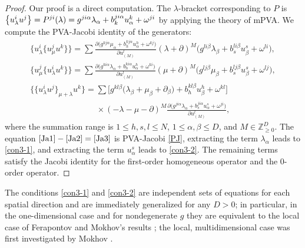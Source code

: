 \documentclass[pdftex]{sigma}
\numberwithin{equation}{section}
\begin{document}
\begin{proof}
Our proof is a direct computation. The $\lambda$-bracket corresponding to $P$ is $\big\lbrace u^i_{\lambda}u^j\big\rbrace=\smash{P^{ji}(\lambda)=g^{ji\alpha}\lambda_\alpha+b^{ji\alpha}_ku^k_\alpha+\omega^{ji}}$ by applying the theory of mPVA. We compute the PVA-Jacobi identity of the generators:
\begin{subequations}
\begin{gather}
\big\lbrace u^i_{\lambda}\big\lbrace u^j_{\mu} u^k\big\rbrace\big\rbrace=\sum\frac{\partial\big(g^{kj\alpha}\mu_\alpha+b^{kj\alpha}_hu^h_\alpha+\omega^{kj}\big)}{\partial u^l_{(M)}}(\lambda+\partial)^M\big(g^{li\beta}\lambda_\beta+b^{li\beta}_su^s_\beta+\omega^{li}\big),\label{Ja1}\\
\big\lbrace u^j_{\mu}\big\lbrace u^i_{\lambda} u^k\big\rbrace\big\rbrace=\sum\frac{\partial\big(g^{ki\alpha}\lambda_\alpha+b^{ki\alpha}_hu^h_\alpha+\omega^{ki}\big)}{\partial u^l_{(M)}}(\mu+\partial)^M\big(g^{lj\beta}\mu_\beta+b^{lj\beta}_su^s_\beta+\omega^{lj}\big),\label{Ja2}\\
\big\lbrace\big\lbrace u^i_{\lambda} u^j\big\rbrace_{\mu+\lambda}u^k\big\rbrace=\sum\big[g^{kl\beta} \big(\lambda_\beta+\mu_\beta+\partial_\beta\big)+b^{kl\beta}_hu^h_\beta+\omega^{kl}\big]\nonumber\\
\phantom{\big\lbrace\big\lbrace u^i_{\lambda} u^j\big\rbrace_{\mu+\lambda}u^k\big\rbrace=}{}\times(-\lambda-\mu-\partial)^M\frac{\partial\big(g^{ji\alpha} \lambda_\alpha+b^{ji\alpha}_su^s_\alpha+\omega^{ji}\big)}{\partial u^l_{(M)}},\label{Ja3}
\end{gather}
\end{subequations}
where the summation range is $1\leq h,s,l\leq N$, $1\leq\alpha,\beta\leq D$, and $M\in\mathbb{Z}^D_{\geq0}$. The equation $\eqref{Ja1}-\eqref{Ja2}=\eqref{Ja3}$ is PVA-Jacobi \eqref{PJ}, extracting the term $\lambda_\alpha$ leads to \eqref{con3-1}, and extracting the term $u^s_\alpha$ leads to \eqref{con3-2}. The remaining terms satisfy the Jacobi identity for the first-order homogeneous operator and the 0-order operator.
\end{proof}

\begin{Remark}
The conditions \eqref{con3-1} and \eqref{con3-2} are independent sets of equations for each spatial direction and are immediately generalized for any $D>0$; in particular, in the one-dimensional case and for nondegenerate $g$ they are equivalent to the local case of Ferapontov and Mokhov's results \cite{mokhov1994hamiltonian}; the local, multidimensional case was first investigated by Mokhov \cite{mokhov1995symplectic}.
\end{Remark}
\end{document}
